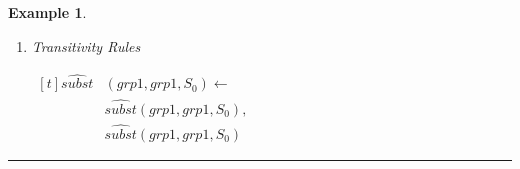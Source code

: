 \documentclass[11pt, twocolumn]{article}
\newtheorem{vexmpl}{Example}
\newenvironment{vexample}
  {\begin{vexmpl}\rm}
  {\rule{2mm}{2mm}\end{vexmpl}}
\begin{document}
\begin{vexample}
\begin{enumerate}
              \begin{math}
                \begin{aligned}[t]
                  \hat{holds}&(alice, read, file, S_{1}) \leftarrow \\
                  & \hat{holds}(grp3, read, file, S_{1}), \\
                  & \hat{memb}(alice, grp3, S_{1}), \\
                  & not \lnot \hat{holds}(alice, read, file, S_{1}) \\
                  \lnot \hat{holds}&(alice, read, file, S_{1}) \leftarrow \\
                  & \lnot \hat{holds}(grp3, read, file, S_{1}), \\
                  & \hat{memb}(alice, grp3, S_{1})
                \end{aligned}
              \end{math}

              \begin{math}
                \begin{aligned}[t]
                  \hat{holds}&(alice, write, file, S_{1}) \leftarrow \\
                  & \hat{holds}(grp3, write, file, S_{1}), \\
                  & \hat{memb}(alice, grp3, S_{1}), \\
                  & not \lnot \hat{holds}(alice, write, file, S_{1}) \\
                  \lnot \hat{holds}&(alice, write, file, S_{1}) \leftarrow \\
                  & \lnot \hat{holds}(grp3, write, file, S_{1}), \\
                  & \hat{memb}(alice, grp3, S_{1})
                \end{aligned}
              \end{math}

            \item
              Transitivity Rules

              \begin{math}
                \begin{aligned}[t]
                  \hat{subst}&(grp1, grp1, S_{0}) \leftarrow \\
                  & \hat{subst}(grp1, grp1, S_{0}), \\
                  & \hat{subst}(grp1, grp1, S_{0})
                \end{aligned}
              \end{math}


\end{enumerate}
\end{vexample}
\end{document}
